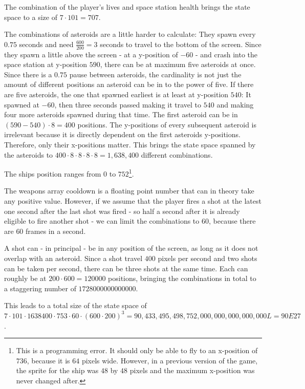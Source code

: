 \documentclass[a4paper,10pt]{article}
\begin{document}
The combination of the player's lives and space station health brings the state space to a size of $7 \cdot 101 = 707$.

The combinations of asteroids are a little harder to calculate: They spawn every $0.75$ seconds and need $\frac{600}{200} = 3$ seconds to travel to the bottom of the screen.
Since they spawn a little above the screen - at a y-position of $-60$ -  and crash into the space station at y-position $590$, there can be at maximum five asteroids at once.
Since there is a $0.75$ pause between asteroids, the cardinality is not just the amount of different positions an asteroid can be in to the power of five.
If there are five asteroids, the one that spawned earliest is at least at y-position $540$: It spawned at $-60$, then three seconds passed making it travel to $540$ and making four more asteroids spawned during that time.
The first asteroid can be in $(590-540)\cdot8 = 400$ positions.
The y-positions of every subsequent asteroid is irrelevant because it is directly dependent on the first asteroids y-positions.
Therefore, only their x-positions matter.
This brings the state space spanned by the asteroids to $400\cdot8\cdot8\cdot8\cdot8 = 1,638,400$ different combinations.

The ships position ranges from $0$ to $752$\footnote{This is a programming error. It should only be able to fly to an x-position of $736$, because it is $64$ pixels wide. However, in a previous version of the game, the sprite for the ship was $48$ by $48$ pixels and the maximum x-position was never changed after.}.

The weapons array cooldown is a floating point number that can in theory take any positive value.
However, if we assume that the player fires a shot at the latest one second after the last shot was fired - so half a second after it is already eligible to fire another shot - we can limit the combinations to $60$, because there are $60$ frames in a second.

A shot can - in principal - be in any position of the screen, as long as it does not overlap with an asteroid.
Since a shot travel $400$ pixels per second and two shots can be taken per second, there can be three shots at the same time.
Each can roughly be at $200 \cdot 600 = 120000$ positions, bringing the combinations in total to a staggering number of $1728000000000000$.

This leads to a total size of the state space of $7\cdot101\cdot1638400\cdot753\cdot60\cdot(600\cdot200)^3 = 90,433,495,498,752,000,000,000,000,000L = 90E27$.
\end{document}
